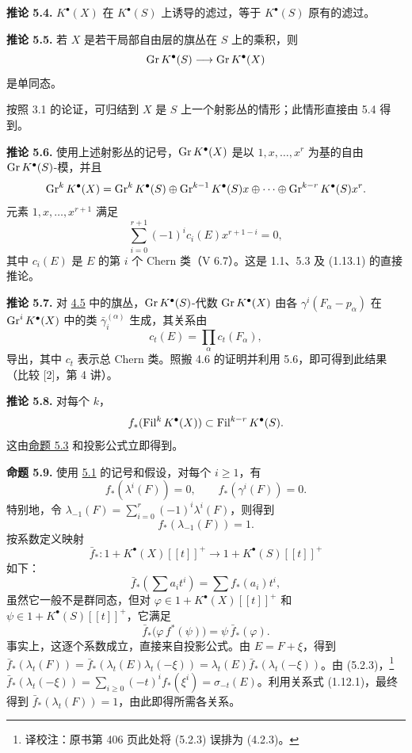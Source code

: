 \textbf{推论 5.4.} \(K^\bullet(X)\) 在 \(K^\bullet(S)\) 上诱导的滤过，等于 \(K^\bullet(S)\) 原有的滤过。

\textbf{推论 5.5.} 若 \(X\) 是若干局部自由层的旗丛在 \(S\) 上的乘积，则
\[
  \operatorname{Gr} K^\bullet(S)\longrightarrow \operatorname{Gr} K^\bullet(X)
\]
是单同态。

按照 3.1 的论证，可归结到 \(X\) 是 \(S\) 上一个射影丛的情形；此情形直接由 5.4 得到。

\textbf{推论 5.6.} 使用上述射影丛的记号，\(\operatorname{Gr} K^\bullet(X)\) 是以 \(1,x,\ldots,x^r\) 为基的自由 \(\operatorname{Gr} K^\bullet(S)\)-模，并且
\[
  \operatorname{Gr}^k K^\bullet(X)
  =\operatorname{Gr}^kK^\bullet(S)\oplus\operatorname{Gr}^{k-1}K^\bullet(S)x\oplus\cdots\oplus\operatorname{Gr}^{k-r}K^\bullet(S)x^r.
\]
元素 \(1,x,\ldots,x^{r+1}\) 满足
\[
  \sum_{i=0}^{r+1}(-1)^i c_i(E)x^{r+1-i}=0,
\]
其中 \(c_i(E)\) 是 \(E\) 的第 \(i\) 个 Chern 类（V 6.7）。这是 1.1、5.3 及 (1.13.1) 的直接推论。

\textbf{推论 5.7.} 对 \hyperlink{sga6.e06.sec.4.5}{4.5} 中的旗丛，\(\operatorname{Gr} K^\bullet(S)\)-代数 \(\operatorname{Gr} K^\bullet(X)\) 由各 \(\gamma^i(F_\alpha-p_\alpha)\) 在 \(\operatorname{Gr}^iK^\bullet(X)\) 中的类 \(\bar\gamma_i^{(\alpha)}\) 生成，其关系由
\[
   c_t(E)=\prod_{\alpha}c_t(F_\alpha),
\]
导出，其中 \(c_t\) 表示总 Chern 类。照搬 4.6 的证明并利用 5.6，即可得到此结果（比较 [2]，第 4 讲）。

\textbf{推论 5.8.} 对每个 \(k\)，
\[
   f_*(\operatorname{Fil}^k K^\bullet(X))\subset \operatorname{Fil}^{k-r} K^\bullet(S).
\]
这由\hyperlink{sga6.e06.prop.5-3}{命题 5.3} 和投影公式立即得到。

\textbf{命题 5.9.} 使用 \hyperlink{sga6.e06.sec.5.1}{5.1} 的记号和假设，对每个 \(i\geq1\)，有
\[
   f_*(\lambda^i(F))=0,
  \qquad
   f_*(\gamma^i(F))=0.
\]
特别地，令 \(\lambda_{-1}(F)=\sum_{i=0}^r(-1)^i\lambda^i(F)\)，则得到
\[
  f_*(\lambda_{-1}(F))=1.
\]
按系数定义映射
\[
  \bar f_*:1+K^\bullet(X)[[t]]^+\longrightarrow 1+K^\bullet(S)[[t]]^+
\]
如下：
\[
  \bar f_*\left(\sum a_i t^i\right)=\sum f_*(a_i)t^i,
\]
虽然它一般不是群同态，但对 \(\varphi\in1+K^\bullet(X)[[t]]^+\) 和 \(\psi\in1+K^\bullet(S)[[t]]^+\)，它满足
\[
   \bar f_*\bigl(\varphi\,f^*(\psi)\bigr)=\psi\,\bar f_*(\varphi).
\]
事实上，这逐个系数成立，直接来自投影公式。由 \(E=F+\xi\)，得到 \(\bar f_*(\lambda_t(F))=\bar f_*(\lambda_t(E)\lambda_t(-\xi))=\lambda_t(E)\bar f_*(\lambda_t(-\xi))\)。由 (5.2.3)，\footnote{译校注：原书第 406 页此处将 (5.2.3) 误排为 (4.2.3)。}\(\bar f_*(\lambda_t(-\xi))=\sum_{i\geq0}(-t)^if_*(\xi^i)=\sigma_{-t}(E)\)。利用关系式 (1.12.1)，最终得到 \(\bar f_*(\lambda_t(F))=1\)，由此即得所需各关系。

